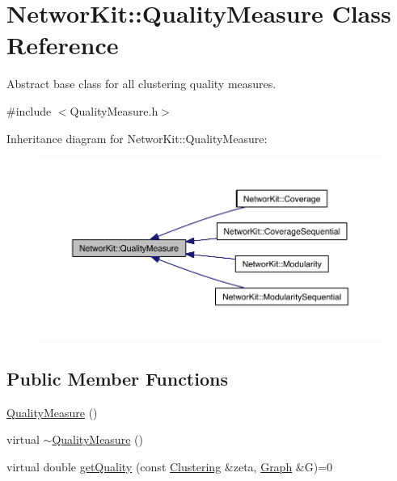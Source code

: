 \hypertarget{class_networ_kit_1_1_quality_measure}{\section{Networ\-Kit\-:\-:Quality\-Measure Class Reference}
\label{class_networ_kit_1_1_quality_measure}
}


Abstract base class for all clustering quality measures.  




{\ttfamily \#include $<$Quality\-Measure.\-h$>$}



Inheritance diagram for Networ\-Kit\-:\-:Quality\-Measure\-:\nopagebreak
\begin{figure}[H]
\begin{center}
\leavevmode
\includegraphics[width=350pt]{class_networ_kit_1_1_quality_measure__inherit__graph}
\end{center}
\end{figure}
\subsection*{Public Member Functions}
\begin{DoxyCompactItemize}
\item 
\hyperlink{class_networ_kit_1_1_quality_measure_ac2b1c035d218ad96d1c6033db44daf28}{Quality\-Measure} ()
\item 
virtual \hyperlink{class_networ_kit_1_1_quality_measure_a759a5867966736d4ce6600c3d9c1cfce}{$\sim$\-Quality\-Measure} ()
\item 
virtual double \hyperlink{class_networ_kit_1_1_quality_measure_a1ca0aecc5d7f564fc627af2baf86239c}{get\-Quality} (const \hyperlink{class_networ_kit_1_1_clustering}{Clustering} \&zeta, \hyperlink{class_networ_kit_1_1_graph}{Graph} \&G)=0
\end{DoxyCompactItemize}


